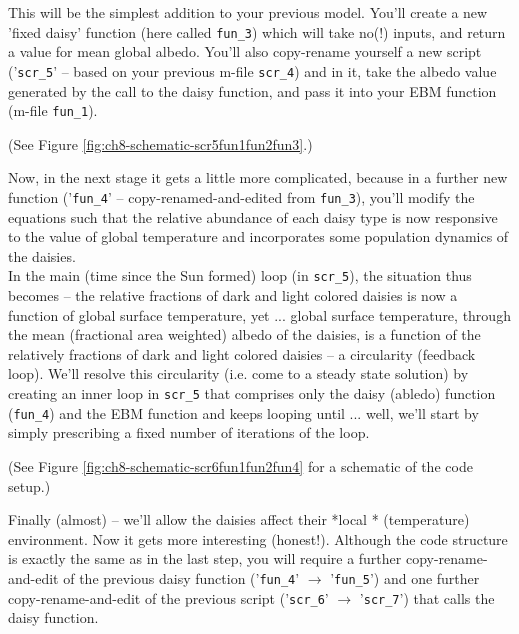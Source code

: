 \documentclass{tufte-book} %
\begin{document}
\begin{description}[align=right]

\setlength{\itemindent}{-0.2in}

\item [6.2.1] This will be the simplest addition to your previous model. You'll create a new 'fixed daisy' function (here called \texttt{fun\_3}) which will take no(!) inputs, and return a value for mean global albedo. You'll also copy-rename yourself a new script ('\texttt{scr\_5}' -- based on your previous \textsf{m-file} \texttt{scr\_4}) and in it, take the albedo value generated by the call to the daisy function, and pass it into your EBM function (\textsf{m-file} \texttt{fun\_1}).

\noindent (See Figure \ref{fig:ch8-schematic-scr5fun1fun2fun3}.)

\item [6.2.2] Now, in the next stage it gets a little more complicated, because in a further new function ('\texttt{fun\_4}' -- copy-renamed-and-edited from \texttt{fun\_3}), you'll modify the equations such that the relative abundance of each daisy type is now responsive to the value of global temperature and incorporates some population dynamics of the daisies.\\ In the main (time since the Sun formed) loop (in \texttt{scr\_5}), the situation thus becomes -- the relative fractions of dark and light colored daisies is now a function of global surface temperature, yet ... global surface temperature, through the mean (fractional area weighted) albedo of the daisies, is a function of the relatively fractions of dark and light colored daisies -- a circularity (feedback loop). We'll resolve this circularity (i.e. come to a steady state solution) by creating an inner loop in \texttt{scr\_5} that comprises only the daisy (abledo) function (\texttt{fun\_4}) and the EBM function and keeps looping until ... well, we'll start by simply prescribing a fixed number of iterations of the loop.

\noindent (See Figure \ref{fig:ch8-schematic-scr6fun1fun2fun4} for a schematic of the code setup.)

\item [6.2.3] Finally (almost) -- we'll allow the daisies affect their *local * (temperature) environment. Now it gets more interesting (honest!). Although the code structure is exactly the same as in the last step, you will require a further copy-rename-and-edit of the previous daisy function ('\texttt{fun\_4}' \(\rightarrow\) '\texttt{fun\_5}') and one further copy-rename-and-edit of the previous script ('\texttt{scr\_6}' \(\rightarrow\) '\texttt{scr\_7}') that calls the daisy function.


\end{description}
\end{document}
